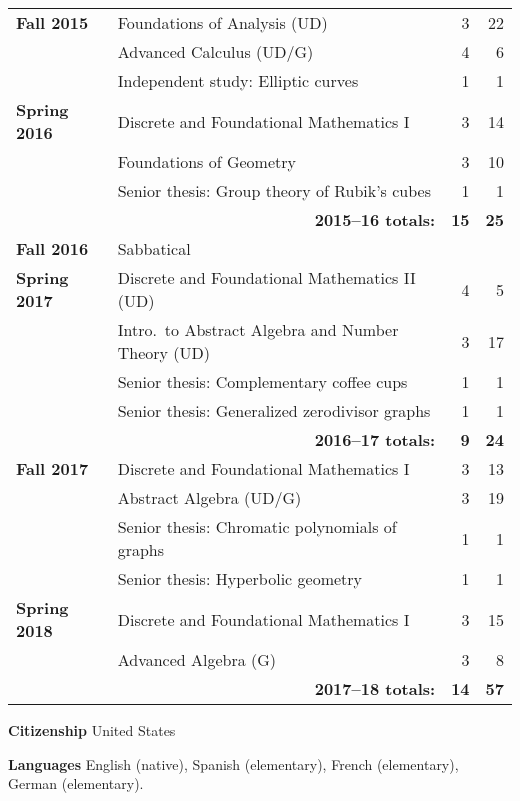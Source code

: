 \documentclass[12pt]{article}
\begin{document}
\begin{center}
\begin{longtable}{@{} l @{\hspace{1ex}} l @{} rr @{}}
\textbf{Fall 2015} & Foundations of Analysis (UD) & 3 & 22 \\
 & Advanced Calculus (UD/G) & 4 & 6 \\
 & Independent study: Elliptic curves & 1 & 1 \\
\addlinespace[0.1in]

\textbf{Spring 2016} & Discrete and Foundational Mathematics I & 3 & 14 \\
 & Foundations of Geometry & 3 & 10 \\
 & Senior thesis: Group theory of Rubik's cubes & 1 & 1 \\
 \cmidrule{2-4}
 & \multicolumn{1}{r}{\textbf{2015--16 totals:}} & \textbf{15} & \textbf{25} \\
 \cmidrule{2-4}

\textbf{Fall 2016} & Sabbatical & & \\
\addlinespace[0.1in]

\textbf{Spring 2017} & Discrete and Foundational Mathematics II (UD) & 4 & 5 \\
 & Intro.\ to Abstract Algebra and Number Theory (UD) & 3 & 17 \\
 & Senior thesis: Complementary coffee cups & 1 & 1 \\
 & Senior thesis: Generalized zerodivisor graphs & 1 & 1 \\
 \cmidrule{2-4}
 & \multicolumn{1}{r}{\textbf{2016--17 totals:}} & \textbf{9} & \textbf{24} \\
 \cmidrule{2-4}
 
\textbf{Fall 2017} & Discrete and Foundational Mathematics I & 3 & 13 \\
 & Abstract Algebra (UD/G) & 3 & 19 \\
 & Senior thesis: Chromatic polynomials of graphs & 1 & 1 \\
 & Senior thesis: Hyperbolic geometry & 1 & 1 \\
\addlinespace[0.1in]

\textbf{Spring 2018} & Discrete and Foundational Mathematics I & 3 & 15 \\
 & Advanced Algebra (G) & 3 & 8 \\
 \cmidrule{2-4}
 & \multicolumn{1}{r}{\textbf{2017--18 totals:}} & \textbf{14} & \textbf{57} \\
 \cmidrule{2-4}

\bottomrule


\end{longtable}
\end{center}





\textbf{Citizenship}
\quad United States
\bigskip


\textbf{Languages}
\quad English (native), Spanish (elementary), French (elementary), German (elementary).
\bigskip
\end{document}
